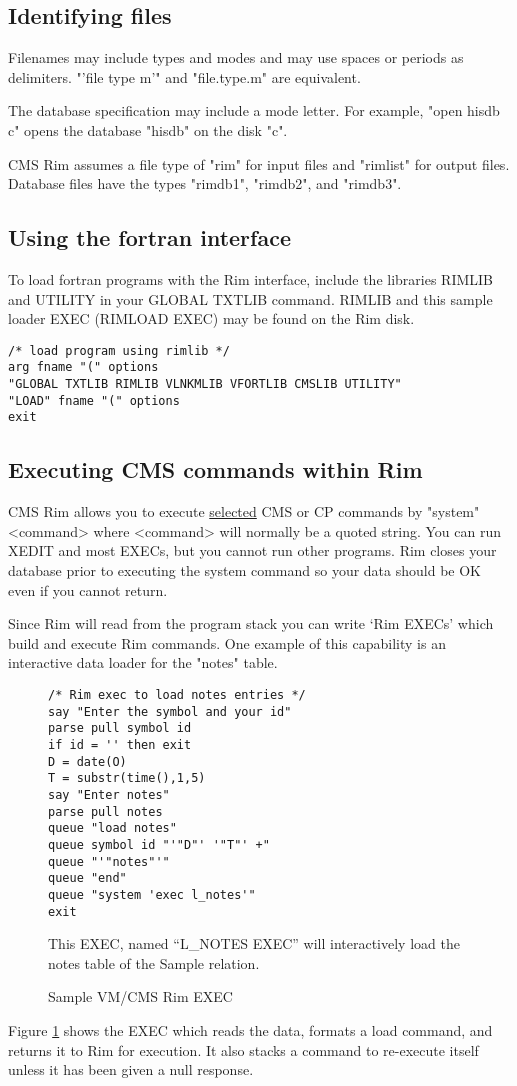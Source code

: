 \subsection{Identifying files}
%
Filenames may include types and modes and may use spaces or periods
as delimiters.
\<"'file type m'" and "file.type.m"\>
are equivalent.
 
The database specification may include a mode letter.
For example,
\<"open hisdb c"\>
opens the database "hisdb" on the disk "c".
 
CMS Rim assumes a file type  of "rim" for input files and
"rimlist" for output files.
Database files have the types "rimdb1", "rimdb2", and "rimdb3".
 
\subsection{Using the fortran interface}
%
To load fortran programs with the Rim interface, include the
libraries RIMLIB and UTILITY
in your GLOBAL TXTLIB command.
RIMLIB and this sample loader EXEC (RIMLOAD EXEC) may be
found on the Rim disk.
 
\begin{verbatim}
/* load program using rimlib */
arg fname "(" options
"GLOBAL TXTLIB RIMLIB VLNKMLIB VFORTLIB CMSLIB UTILITY"
"LOAD" fname "(" options
exit
\end{verbatim}
 
\subsection{Executing CMS commands within Rim}
%
CMS Rim allows you to execute \underline{selected} CMS or
CP commands by
\<"system" <command>\>
where <command> will normally be a quoted string.
You can run XEDIT and most EXECs, but you cannot run other
programs.  Rim closes your database prior to executing
the system command so your data should be OK even if you
cannot return.
 
\medskip
 
Since Rim will read from the program stack you can write
`Rim EXECs' which build and execute Rim commands.
One example of this capability is an interactive
data loader for the "notes" table.
%
\begin{figure}[htp]
\narrower
\begin{verbatim}
/* Rim exec to load notes entries */
say "Enter the symbol and your id"
parse pull symbol id
if id = '' then exit
D = date(O)
T = substr(time(),1,5)
say "Enter notes"
parse pull notes
queue "load notes"
queue symbol id "'"D"' '"T"' +"
queue "'"notes"'"
queue "end"
queue "system 'exec l_notes'"
exit
\end{verbatim}
\caption{Sample VM/CMS Rim EXEC}
{This EXEC, named ``L_NOTES EXEC'' will
interactively load the notes table of the Sample relation.\par}
\label{CMS-exec}
\end{figure}
%
Figure \ref{CMS-exec} shows the EXEC which reads the data,    formats
a load command, and returns it to Rim for execution. It also
stacks a command to re-execute itself unless it has been given
a null response.
 
